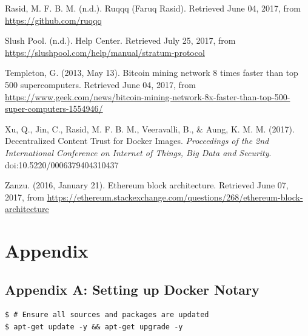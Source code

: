 \documentclass[a4paper,12pt]{article}
\begin{document}
{{\begin{thebibliography}{9}
Rasid, M. F. B. M. (n.d.). Ruqqq (Faruq Rasid). Retrieved June 04, 2017, from \href{https://github.com/ruqqq}{https://github.com/ruqqq}
		

Slush Pool. (n.d.). Help Center. Retrieved July 25, 2017, from \href{https://slushpool.com/help/manual/stratum-protocol}{https://slushpool.com/help/manual/stratum-protocol}
	

Templeton, G. (2013, May 13). Bitcoin mining network 8 times faster than top 500 supercomputers. Retrieved June 04, 2017, from \href{https://www.geek.com/news/bitcoin-mining-network-8x-faster-than-top-500-super-computers-1554946/}{https://www.geek.com/news/bitcoin-mining-network-8x-faster-than-top-500-super-computers-1554946/}

Xu, Q., Jin, C., Rasid, M. F. B. M., Veeravalli, B., \& Aung, K. M. M. (2017). Decentralized Content Trust for Docker Images. \textit{Proceedings of the  2nd International Conference on Internet of Things, Big Data and Security}. doi:10.5220/0006379404310437

Zanzu. (2016, January 21). Ethereum block architecture. Retrieved June 07, 2017, from \href{https://ethereum.stackexchange.com/questions/268/ethereum-block-architecture}{https://ethereum.stackexchange.com/questions/268/ethereum-block-architecture}
		
	\end{thebibliography}
	\newpage
	\section{Appendix}
	\subsection{Appendix A: Setting up Docker Notary}
\begin{verbatim}
$ # Ensure all sources and packages are updated
$ apt-get update -y && apt-get upgrade -y


\end{verbatim}}}
\end{document}
